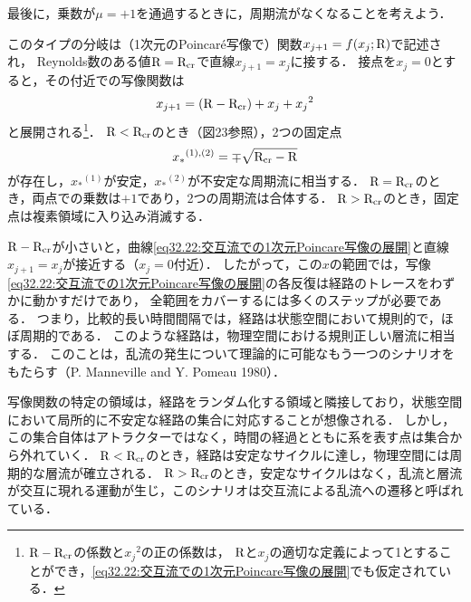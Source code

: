 最後に，乗数が$\mu=+1$を通過するときに，周期流がなくなることを考えよう．



このタイプの分岐は（1次元のPoincar\'{e}写像で）関数$x_{j+1}=f(x_j;\mathrm{R})$で記述され，
Reynolds数のある値$\mathrm{R}=\mathrm{R}_{\mathrm{cr}}$で直線$x_{j+1}=x_j$に接する．
接点を$x_j=0$とすると，その付近での写像関数は
\begin{equation}\label{eq32.22:交互流での1次元Poincare写像の展開}
    x_{j+1} = (\mathrm{R}-\mathrm{R}_{\mathrm{cr}}) + x_j + {x_j}^2
\end{equation}
と展開される\footnote{$\mathrm{R}-\mathrm{R}_{\mathrm{cr}}$の係数と${x_j}^2$の正の係数は，
$\mathrm{R}$と$x_j$の適切な定義によって1とすることができ，\eqref{eq32.22:交互流での1次元Poincare写像の展開}でも仮定されている．}．
$\mathrm{R}<\mathrm{R}_{\mathrm{cr}}$のとき（図23参照），2つの固定点
\[
    {x_*}^{(1),(2)} = \mp \sqrt{\mathrm{R}_{\mathrm{cr}}-\mathrm{R}}
\]
が存在し，${x_*}^{(1)}$が安定，${x_*}^{(2)}$が不安定な周期流に相当する．
$\mathrm{R}=\mathrm{R}_{\mathrm{cr}}$のとき，両点での乗数は$+1$であり，2つの周期流は合体する．
$\mathrm{R}>\mathrm{R}_{\mathrm{cr}}$のとき，固定点は複素領域に入り込み消滅する．



$\mathrm{R}-\mathrm{R}_{\mathrm{cr}}$が小さいと，曲線\eqref{eq32.22:交互流での1次元Poincare写像の展開}と直線$x_{j+1}=x_j$が接近する（$x_j=0$付近）．
したがって，この$x$の範囲では，写像\eqref{eq32.22:交互流での1次元Poincare写像の展開}の各反復は経路のトレースをわずかに動かすだけであり，
全範囲をカバーするには多くのステップが必要である．
つまり，比較的長い時間間隔では，経路は状態空間において規則的で，ほぼ周期的である．
このような経路は，物理空間における規則正しい層流に相当する．
このことは，乱流の発生について理論的に可能なもう一つのシナリオをもたらす（P. Manneville and Y. Pomeau 1980）．




写像関数の特定の領域は，経路をランダム化する領域と隣接しており，状態空間において局所的に不安定な経路の集合に対応することが想像される．
しかし，この集合自体はアトラクターではなく，時間の経過とともに系を表す点は集合から外れていく．
$\mathrm{R}<\mathrm{R}_{\mathrm{cr}}$のとき，経路は安定なサイクルに達し，物理空間には周期的な層流が確立される．
$\mathrm{R}>\mathrm{R}_{\mathrm{cr}}$のとき，安定なサイクルはなく，乱流と層流が交互に現れる運動が生じ，このシナリオは交互流による乱流への遷移と呼ばれている．



